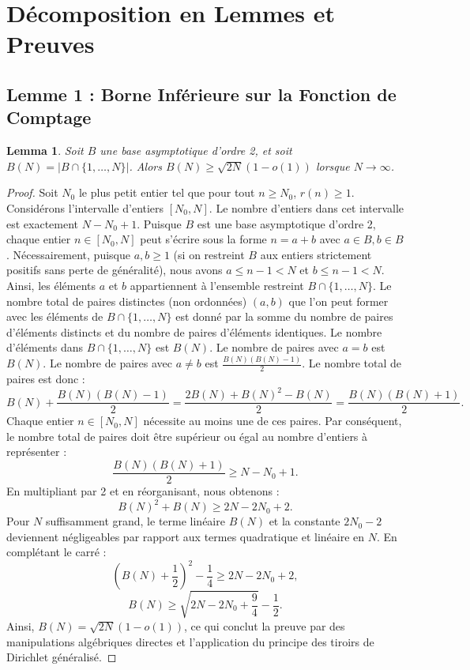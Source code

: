 \documentclass[11pt,a4paper]{article}
\newtheorem{lemma}[theorem]{Lemma}
\begin{document}
\section{D\'ecomposition en Lemmes et Preuves}
\subsection{Lemme 1 : Borne Inf\'erieure sur la Fonction de Comptage}
\begin{lemma}
Soit $B$ une base asymptotique d'ordre 2, et soit $B(N) = |B \cap \{1, \dots, N\}|$. Alors $B(N) \ge \sqrt{2N}(1 - o(1))$ lorsque $N \to \infty$.
\end{lemma}
\begin{proof}
Soit $N_0$ le plus petit entier tel que pour tout $n \ge N_0$, $r(n) \ge 1$.
Consid\'erons l'intervalle d'entiers $[N_0, N]$. Le nombre d'entiers dans cet intervalle est exactement $N - N_0 + 1$.
Puisque $B$ est une base asymptotique d'ordre 2, chaque entier $n \in [N_0, N]$ peut s'\'ecrire sous la forme $n = a + b$ avec $a \in B, b \in B$.
N\'ecessairement, puisque $a, b \ge 1$ (si on restreint $B$ aux entiers strictement positifs sans perte de g\'en\'eralit\'e), nous avons $a \le n - 1 < N$ et $b \le n - 1 < N$. Ainsi, les \'el\'ements $a$ et $b$ appartiennent \`a l'ensemble restreint $B \cap \{1, \dots, N\}$.
Le nombre total de paires distinctes (non ordonn\'ees) $(a, b)$ que l'on peut former avec les \'el\'ements de $B \cap \{1, \dots, N\}$ est donn\'e par la somme du nombre de paires d'\'el\'ements distincts et du nombre de paires d'\'el\'ements identiques.
Le nombre d'\'el\'ements dans $B \cap \{1, \dots, N\}$ est $B(N)$.
Le nombre de paires avec $a = b$ est $B(N)$.
Le nombre de paires avec $a \neq b$ est $\frac{B(N)(B(N) - 1)}{2}$.
Le nombre total de paires est donc :
\begin{equation}
B(N) + \frac{B(N)(B(N) - 1)}{2} = \frac{2B(N) + B(N)^2 - B(N)}{2} = \frac{B(N)(B(N) + 1)}{2}.
\end{equation}
Chaque entier $n \in [N_0, N]$ n\'ecessite au moins une de ces paires. Par cons\'equent, le nombre total de paires doit \^etre sup\'erieur ou \'egal au nombre d'entiers \`a repr\'esenter :
\begin{equation}
\frac{B(N)(B(N) + 1)}{2} \ge N - N_0 + 1.
\end{equation}
En multipliant par 2 et en r\'eorganisant, nous obtenons :
\begin{equation}
B(N)^2 + B(N) \ge 2N - 2N_0 + 2.
\end{equation}
Pour $N$ suffisamment grand, le terme lin\'eaire $B(N)$ et la constante $2N_0 - 2$ deviennent n\'egligeables par rapport aux termes quadratique et lin\'eaire en $N$. En compl\'etant le carr\'e :
\begin{equation}
\left(B(N) + \frac{1}{2}\right)^2 - \frac{1}{4} \ge 2N - 2N_0 + 2,
\end{equation}
\begin{equation}
B(N) \ge \sqrt{2N - 2N_0 + \frac{9}{4}} - \frac{1}{2}.
\end{equation}
Ainsi, $B(N) = \sqrt{2N}(1 - o(1))$, ce qui conclut la preuve par des manipulations alg\'ebriques directes et l'application du principe des tiroirs de Dirichlet g\'en\'eralis\'e.
\end{proof}
\end{document}
